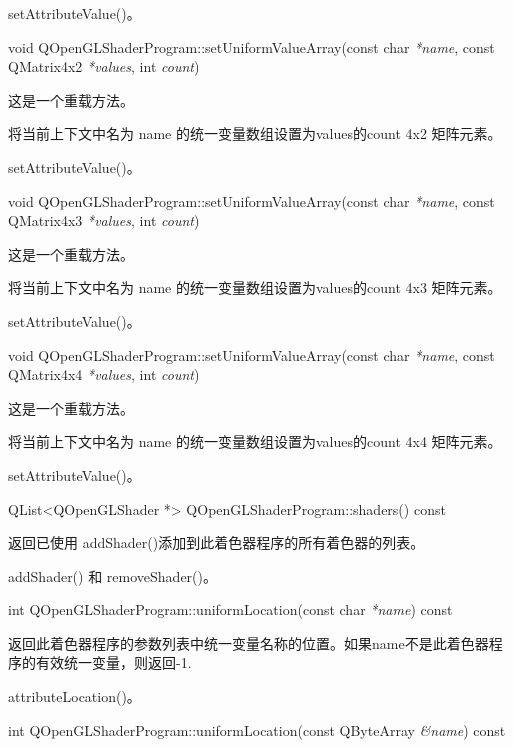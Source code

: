 \begin{seeAlso}
setAttributeValue()。
\end{seeAlso}

void QOpenGLShaderProgram::setUniformValueArray(const char \emph{*name}, const QMatrix4x2 \emph{*values}, int \emph{count})

这是一个重载方法。

将当前上下文中名为 name 的统一变量数组设置为values的count 4x2 矩阵元素。

\begin{seeAlso}
setAttributeValue()。
\end{seeAlso}

void QOpenGLShaderProgram::setUniformValueArray(const char \emph{*name}, const QMatrix4x3 \emph{*values}, int \emph{count})

这是一个重载方法。

将当前上下文中名为 name 的统一变量数组设置为values的count 4x3 矩阵元素。

\begin{seeAlso}
setAttributeValue()。
\end{seeAlso}

void QOpenGLShaderProgram::setUniformValueArray(const char \emph{*name}, const QMatrix4x4 \emph{*values}, int \emph{count})

这是一个重载方法。

将当前上下文中名为 name 的统一变量数组设置为values的count 4x4 矩阵元素。

\begin{seeAlso}
setAttributeValue()。
\end{seeAlso}

QList<QOpenGLShader *> QOpenGLShaderProgram::shaders() const

返回已使用 addShader()添加到此着色器程序的所有着色器的列表。

\begin{seeAlso}
addShader() 和 removeShader()。
\end{seeAlso}

int QOpenGLShaderProgram::uniformLocation(const char \emph{*name}) const

返回此着色器程序的参数列表中统一变量名称的位置。如果name不是此着色器程序的有效统一变量，则返回-1.

\begin{seeAlso}
attributeLocation()。
\end{seeAlso}

int QOpenGLShaderProgram::uniformLocation(const QByteArray \emph{\&name}) const

